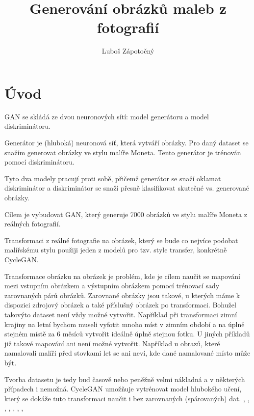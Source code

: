 \documentclass[czech]{mvi-report}
\title{Generování obrázků maleb z fotografií}
\author{Luboš Zápotočný}
\affiliation{ČVUT - FIT}
\begin{document}
\maketitle

\section{Úvod}
GAN se skládá ze dvou neuronových sítí: model generátoru a model diskriminátoru.

Generátor je (hluboká) neuronová síť, která vytváří obrázky. Pro daný dataset se snažím generovat obrázky ve stylu malíře Moneta. Tento generátor je trénován pomocí diskriminátoru.

Tyto dva modely pracují proti sobě, přičemž generátor se snaží oklamat diskriminátor a diskriminátor se snaží přesně klasifikovat skutečné vs. generované obrázky.

Cílem je vybudovat GAN, který generuje 7000 obrázků ve stylu malíře Moneta z reálných fotografií.

Transformaci z reálné fotografie na obrázek, který se bude co nejvíce podobat malířskému stylu použiji jeden z modelů pro tzv. style transfer, konkrétně CycleGAN.

Transformace obrázku na obrázek je problém, kde je cílem naučit se mapování mezi vstupním obrázkem a výstupním obrázkem pomocí trénovací sady zarovnaných párů obrázků. Zarovnané obrázky jsou takové, u kterých máme k dispozici zdrojový obrázek a také příslušný obrázek po transformaci. Bohužel takovýto dataset není vždy možné vytvořit. Například při transformaci zimní krajiny na letní bychom museli vyfotit mnoho míst v zimním období a na úplně stejném místě za 6 měsíců vytvořit ideálně úplně stejnou fotku. U jiných příkladů již takové mapování ani není možné vytvořit. Například u obrazů, které namalovali malíři před stovkami let se ani neví, kde dané namalované místo může být.

Tvorba datasetu je tedy buď časově nebo peněžně velmi nákladná a v některých případech i nemožná. CycleGAN umožňuje vytrénovat model hlubokého učení, který se dokáže tuto transformaci naučit i bez zarovnaných (spárovaných) dat. \cite{GAN}, \cite{CycleGAN}, \cite{mosquera_2020}, \cite{kikaben_2022}, \cite{brownlee_2020_cyclegan}, \cite{brownlee_2020_conv}, \cite{brownlee_2019_batch}, \cite{brownlee_2019_norm}

\end{document}
